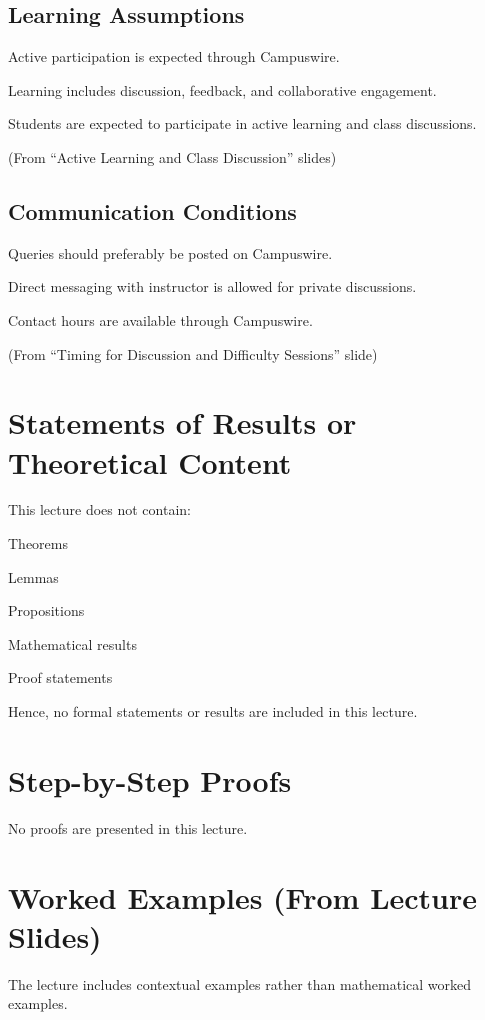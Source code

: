\documentclass[12pt]{article}
\begin{document}
\subsection{Learning Assumptions}

Active participation is expected through Campuswire.

Learning includes discussion, feedback, and collaborative engagement.

Students are expected to participate in active learning and class discussions.

(From “Active Learning and Class Discussion” slides) 


\subsection{Communication Conditions}

Queries should preferably be posted on Campuswire.

Direct messaging with instructor is allowed for private discussions.

Contact hours are available through Campuswire.

(From “Timing for Discussion and Difficulty Sessions” slide) 


\section{Statements of Results or Theoretical Content}

This lecture does not contain:

Theorems

Lemmas

Propositions

Mathematical results

Proof statements

Hence, no formal statements or results are included in this lecture.

\section{Step-by-Step Proofs}

No proofs are presented in this lecture.

\section{Worked Examples (From Lecture Slides)}

The lecture includes contextual examples rather than mathematical worked examples.
\end{document}
